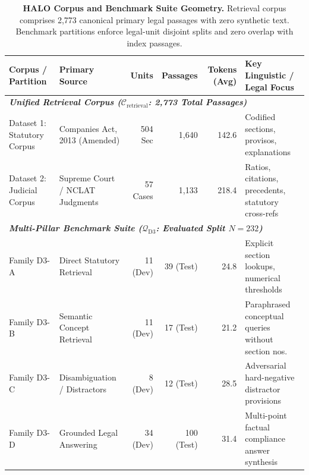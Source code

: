 
\begin{table}[t]
\centering
\small
\begin{tabular}{llrrrl}
\toprule
\textbf{Corpus / Partition} & \textbf{Primary Source} & \textbf{Units} & \textbf{Passages} & \textbf{Tokens (Avg)} & \textbf{Key Linguistic / Legal Focus} \\
\midrule
\multicolumn{6}{l}{\textit{\textbf{Unified Retrieval Corpus ($\mathcal{C}_{\text{retrieval}}$: 2,773 Total Passages)}}} \\
Dataset 1: Statutory Corpus & Companies Act, 2013 (Amended) & 504 Sec & 1,640 & 142.6 & Codified sections, provisos, explanations \\
Dataset 2: Judicial Corpus  & Supreme Court / NCLAT Judgments & 57 Cases & 1,133 & 218.4 & Ratios, citations, precedents, statutory cross-refs \\
\midrule
\multicolumn{6}{l}{\textit{\textbf{Multi-Pillar Benchmark Suite ($\mathcal{Q}_{\text{D3}}$: Evaluated Split $N = 232$)}}} \\
Family D3-A & Direct Statutory Retrieval & 11 (Dev) & 39 (Test) & 24.8 & Explicit section lookups, numerical thresholds \\
Family D3-B & Semantic Concept Retrieval & 11 (Dev) & 17 (Test) & 21.2 & Paraphrased conceptual queries without section nos. \\
Family D3-C & Disambiguation / Distractors & 8 (Dev)  & 12 (Test) & 28.5 & Adversarial hard-negative distractor provisions \\
Family D3-D & Grounded Legal Answering & 34 (Dev) & 100 (Test) & 31.4 & Multi-point factual compliance answer synthesis \\
\bottomrule
\end{tabular}
\caption{\textbf{HALO Corpus and Benchmark Suite Geometry.} Retrieval corpus comprises 2,773 canonical primary legal passages with zero synthetic text. Benchmark partitions enforce legal-unit disjoint splits and zero overlap with index passages.}
\label{tab:corpus_geometry}
\end{table}

